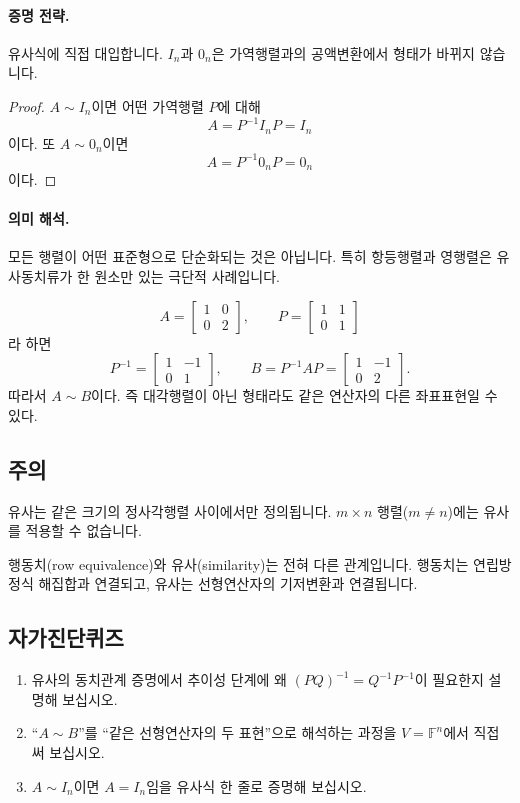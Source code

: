 \paragraph{증명 전략.}
유사식에 직접 대입합니다. $I_n$과 $0_n$은 가역행렬과의 공액변환에서 형태가 바뀌지 않습니다.

\begin{proof}
$A\sim I_n$이면 어떤 가역행렬 $P$에 대해
$$
A=P^{-1}I_nP=I_n
$$
이다.
또 $A\sim 0_n$이면
$$
A=P^{-1}0_nP=0_n
$$
이다.
\end{proof}

\paragraph{의미 해석.}
모든 행렬이 어떤 표준형으로 단순화되는 것은 아닙니다. 특히 항등행렬과 영행렬은 유사동치류가 한 원소만 있는 극단적 사례입니다.

\begin{example}
$$
A=\begin{bmatrix}1&0\\0&2\end{bmatrix},\qquad
P=\begin{bmatrix}1&1\\0&1\end{bmatrix}
$$
라 하면
$$
P^{-1}=\begin{bmatrix}1&-1\\0&1\end{bmatrix},\qquad
B=P^{-1}AP=\begin{bmatrix}1&-1\\0&2\end{bmatrix}.
$$
따라서 $A\sim B$이다. 즉 대각행렬이 아닌 형태라도 같은 연산자의 다른 좌표표현일 수 있다.
\end{example}

\subsection*{주의}
\begin{warning}
유사는 같은 크기의 정사각행렬 사이에서만 정의됩니다. $m\times n$ 행렬($m\neq n$)에는 유사를 적용할 수 없습니다.
\end{warning}
\begin{warning}
행동치(row equivalence)와 유사(similarity)는 전혀 다른 관계입니다. 행동치는 연립방정식 해집합과 연결되고, 유사는 선형연산자의 기저변환과 연결됩니다.
\end{warning}

\subsection*{자가진단퀴즈}
\begin{enumerate}[label=\arabic*.]
\item 유사의 동치관계 증명에서 추이성 단계에 왜 $(PQ)^{-1}=Q^{-1}P^{-1}$이 필요한지 설명해 보십시오.
\item ``$A\sim B$''를 ``같은 선형연산자의 두 표현''으로 해석하는 과정을 $V=\mathbb F^n$에서 직접 써 보십시오.
\item $A\sim I_n$이면 $A=I_n$임을 유사식 한 줄로 증명해 보십시오.
\end{enumerate}

